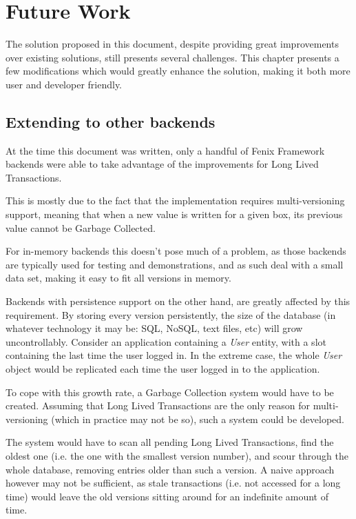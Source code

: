 \chapter{Future Work}

The solution proposed in this document, despite providing great
improvements over existing solutions, still presents several
challenges. This chapter presents a few modifications which would
greatly enhance the solution, making it both more user and developer
friendly. 

\section{Extending to other backends}

At the time this document was written, only a handful of Fenix
Framework backends were able to take advantage of the improvements for
Long Lived Transactions.

This is mostly due to the fact that the implementation requires
multi-versioning support, meaning that when a new value is written for
a given box, its previous value cannot be Garbage Collected.

For in-memory backends this doesn't pose much of a problem, as those
backends are typically used for testing and demonstrations, and as
such deal with a small data set, making it easy to fit all versions in
memory. 

Backends with persistence support on the other hand, are greatly
affected by this requirement. By storing every version persistently,
the size of the database (in whatever technology it may be: SQL,
NoSQL, text files, etc) will grow uncontrollably. Consider an
application containing a {\it User} entity, with a slot containing the
last time the user logged in. In the extreme case, the whole {\it
  User} object would be replicated each time the user logged in to the
application.

To cope with this growth rate, a Garbage Collection system would have
to be created. Assuming that Long Lived Transactions are the only
reason for multi-versioning (which in practice may not be so), such a
system could be developed.

The system would have to scan all pending Long Lived Transactions,
find the oldest one (i.e. the one with the smallest version number),
and scour through the whole database, removing entries older than such
a version. A naive approach however may not be sufficient, as stale
transactions (i.e. not accessed for a long time) would leave the old
versions sitting around for an indefinite amount of time.

